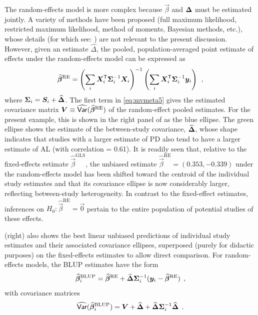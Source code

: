 The random-effects model is more complex because $\vec{\beta}$ and $\bm{\Delta}$ must be estimated jointly.
A variety of methods have been proposed (full maximum likelihood, restricted maximum likelihood, method of
moments, Bayesian methods, etc.), whose details (for which see: \citet{Jackson-etal-2011}) are not relevant to the present discussion. 
However, given an estimate $\widehat{\Delta}$, the pooled, population-averaged point estimate of effects under the
random-effects model can be expressed as
\begin{equation} \label{eq:mvmeta5}
\widehat{\bm{\beta}}^{\textrm{RE}} = \left(\sum_i \bm{X}_i^\mathsf{T}  \bm{\Sigma}_i^{-1} \bm{X}_i  \right)^{-1}
                                      \left(\sum_i \bm{X}_i^\mathsf{T}  \bm{\Sigma}_i^{-1} \bm{y}_i \right) \:\: ,
\end{equation}
where $\bm{\Sigma}_i = \bm{S}_i + \widehat{\bm{\Delta}}$.
The first term in \eqref{eq:mvmeta5} gives the estimated covariance matrix $\bm{V} \equiv \widehat{\mathsf{Var}}(\widehat{\bm{\beta}}^{\textrm{RE}})$
of the random-effect pooled estimates.
For the present example, this is shown in the right panel of  as the blue ellipse.  The green ellipse shows the
estimate of the between-study covariance, $\widehat{\bm{\Delta}}$, whose shape indicates that studies with a larger estimate
of PD also tend to have a larger estimate of AL (with correlation = 0.61).
It is readily seen that, relative to
the fixed-effects estimate $\widehat{\vec{\beta}}^{\textrm{GLS}}$,
the unbiased estimate $\widehat{\vec{\beta}}^{\textrm{RE}} = (0.353, -0.339)$
under the random-effects model  
has been shifted toward the centroid of the individual study estimates
and that its covariance ellipse is now considerably larger, reflecting between-study heterogeneity.
In contrast to the fixed-effect estimates, inferences on $H_0 : \widehat{\vec{\beta}}^{\textrm{RE}} = \vec{0}$
pertain to the entire population of potential studies of these effects.

(right) also shows the best linear unbiased predictions of individual study estimates
and their associated covariance ellipses, superposed (purely for didactic purposes)
on the fixed-effects estimates to allow direct comparison.
For random-effects models, the BLUP estimates have the form
\begin{equation} \label{eq:mvmeta6}
\widehat{\bm{\beta}}_i^{\textrm{BLUP}} = \widehat{\bm{\beta}}^{\textrm{RE}} + \widehat{\bm{\Delta}}  \bm{\Sigma}_i^{-1} (\bm{y}_i - \widehat{\bm{\beta}}^{\textrm{RE}}) \:\: ,
\end{equation}
with covariance matrices
\begin{equation} \label{eq:mvmeta7}
\widehat{\mathsf{Var}}(\widehat{\bm{\beta}}_i^{\textrm{BLUP}}) = \bm{V} + \widehat{\bm{\Delta}} + \widehat{\bm{\Delta}}  \bm{\Sigma}_i^{-1} \widehat{\bm{\Delta}}
\:\: .
\end{equation}


